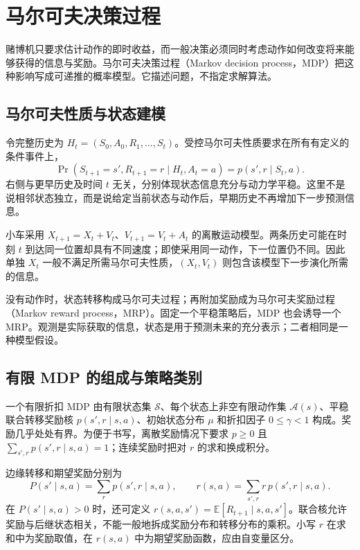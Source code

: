 \setcounter{chapter}{3} %
\chapter{马尔可夫决策过程}
\label{ch:rl-mdp}

赌博机只要求估计动作的即时收益，而一般决策必须同时考虑动作如何改变将来能够获得的信息与奖励。马尔可夫决策过程（Markov decision process，MDP）把这种影响写成可递推的概率模型。它描述问题，不指定求解算法。

\section{马尔可夫性质与状态建模}

令完整历史为 $H_t=(S_0,A_0,R_1,\ldots,S_t)$。受控马尔可夫性质要求在所有有定义的条件事件上，
\[
\Pr(S_{t+1}=s',R_{t+1}=r\mid H_t,A_t=a)
=p(s',r\mid S_t,a).
\]
右侧与更早历史及时间 $t$ 无关，分别体现状态信息充分与动力学平稳。这里不是说相邻状态独立，而是说给定当前状态与动作后，早期历史不再增加下一步预测信息。

\begin{example}[位置为何可能不是状态]
小车采用 $X_{t+1}=X_t+V_t$、$V_{t+1}=V_t+A_t$ 的离散运动模型。两条历史可能在时刻 $t$ 到达同一位置却具有不同速度；即使采用同一动作，下一位置仍不同。因此单独 $X_t$ 一般不满足所需马尔可夫性质，$(X_t,V_t)$ 则包含该模型下一步演化所需的信息。
\end{example}

没有动作时，状态转移构成马尔可夫过程；再附加奖励成为马尔可夫奖励过程（Markov reward process，MRP）。固定一个平稳策略后，MDP 也会诱导一个 MRP。观测是实际获取的信息，状态是用于预测未来的充分表示；二者相同是一种模型假设。

\section{有限 MDP 的组成与策略类别}

\begin{definition}
一个有限折扣 MDP 由有限状态集 $\mathcal S$、每个状态上非空有限动作集 $\mathcal A(s)$、平稳联合转移奖励核 $p(s',r\mid s,a)$、初始状态分布 $\mu$ 和折扣因子 $0\leq\gamma<1$ 构成。奖励几乎处处有界。为便于书写，离散奖励情况下要求 $p\geq0$ 且 $\sum_{s',r}p(s',r\mid s,a)=1$；连续奖励时把对 $r$ 的求和换成积分。
\end{definition}

边缘转移和期望奖励分别为
\[
P(s'\mid s,a)=\sum_r p(s',r\mid s,a),\qquad
r(s,a)=\sum_{s',r}r\,p(s',r\mid s,a).
\]
在 $P(s'\mid s,a)>0$ 时，还可定义 $r(s,a,s')=\mathbb E[R_{t+1}\mid s,a,s']$。联合核允许奖励与后继状态相关，不能一般地拆成奖励分布和转移分布的乘积。小写 $r$ 在求和中为奖励取值，在 $r(s,a)$ 中为期望奖励函数，应由自变量区分。

